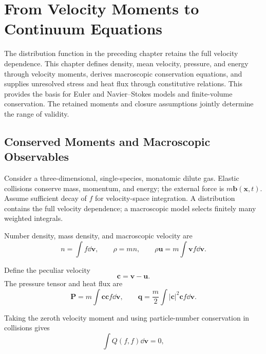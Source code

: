 \chapter{From Velocity Moments to Continuum Equations}\label{ch:2}

\begin{chaptersummary}
The distribution function in the preceding chapter retains the full velocity dependence. This chapter defines density, mean velocity, pressure, and energy through velocity moments, derives macroscopic conservation equations, and supplies unresolved stress and heat flux through constitutive relations. This provides the basis for Euler and Navier--Stokes models and finite-volume conservation. The retained moments and closure assumptions jointly determine the range of validity.
\end{chaptersummary}

\section{Conserved Moments and Macroscopic Observables}
Consider a three-dimensional, single-species, monatomic dilute gas. Elastic collisions conserve mass, momentum, and energy; the external force is $m\bm b(\bm x,t)$. Assume sufficient decay of $f$ for velocity-space integration.
A distribution contains the full velocity dependence; a macroscopic model selects finitely many weighted integrals.

Number density, mass density, and macroscopic velocity are
\[
n=\int f\dd\bm v,
\qquad
\rho=mn,
\qquad
\rho\bm u=m\int \bm v f\dd\bm v.
\]

Define the peculiar velocity
\[
\bm c=\bm v-\bm u.
\]
The pressure tensor and heat flux are
\[
\bm P=m\int \bm c\bm c f\dd\bm v,
\qquad
\bm q=\frac{m}{2}\int |\bm c|^2\bm c f\dd\bm v.
\]

Taking the zeroth velocity moment and using particle-number conservation in collisions gives
\[
\int Q(f,f)\dd\bm v=0,
\]

